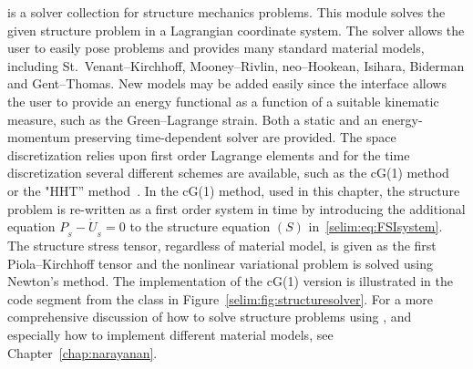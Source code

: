  is a solver collection for structure mechanics
problems. This module solves the given structure problem in a
Lagrangian coordinate system.  The solver allows the user to easily
pose problems and provides many standard material models, including
St.~Venant--Kirchhoff, Mooney--Rivlin, neo--Hookean, Isihara, Biderman
and Gent--Thomas. New models may be added easily since the interface
allows the user to provide an energy functional as a function of a
suitable kinematic measure, such as the Green--Lagrange strain. Both a
static and an energy-momentum preserving time-dependent solver are
provided. The space discretization relies upon first order Lagrange
elements and for the time discretization several different schemes are
available, such as the cG(1)
method~\citep{ErikssonEstepHansboEtAl1996} or the "HHT''
method~\citep{HilberHughesTaylor1977}.  In the cG(1) method, used in
this chapter, the structure problem is re-written as a first order
system in time by introducing the additional equation $P_{_{S}} -
\dot{U}_{_{S}} = 0$ to the structure equation $(S)$
in~\eqref{selim:eq:FSIsystem}. The structure stress tensor, regardless
of material model, is given as the first Piola--Kirchhoff tensor and
the nonlinear variational problem is solved using Newton's method.
The implementation of the cG(1) version is illustrated in the code
segment from the class  in
Figure~\ref{selim:fig:structuresolver}. For a more comprehensive
discussion of how to solve structure problems using ,
and especially how to implement different material models, see
Chapter~\ref{chap:narayanan}.

